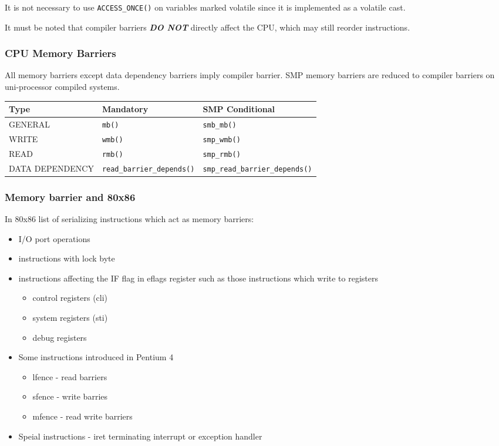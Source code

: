 \documentclass{article}
\begin{document}
It is not necessary to use \lstinline{ACCESS_ONCE()} on variables
marked volatile since it is implemented as a volatile cast.

It must be noted that compiler barriers \textbf{\emph{DO NOT}}
directly affect the CPU, which may still reorder instructions.


\subsubsection{CPU Memory Barriers}

All memory barriers except data dependency barriers imply compiler
barrier. SMP memory barriers are reduced to compiler barriers on
uni-processor compiled systems. 

\begin{center}
  \begin{tabular}{| l| l | l | }    
    \hline
    Type & Mandatory & SMP Conditional \\ \hline
    GENERAL & \lstinline{mb()} & \lstinline{smb_mb()} \\ 
    WRITE & \lstinline{wmb()} & \lstinline{smp_wmb()}  \\ 
    READ &  \lstinline{rmb()} & \lstinline{smp_rmb()}  \\
    DATA DEPENDENCY &  \lstinline{read_barrier_depends()} & \lstinline{smp_read_barrier_depends()} \\
    \hline
  \end{tabular}
\end{center}


\subsubsection{Memory barrier and 80x86}

  In 80x86 list of serializing instructions which act as memory
  barriers:


  \begin{itemize}
    \item I/O port operations
    \item instructions with lock byte
    \item instructions affecting the IF flag in eflags register such as those instructions which write to registers
      \begin{itemize}
        \item control registers (cli)
        \item system  registers (sti)
        \item debug   registers          
      \end {itemize}
    \item Some instructions introduced in Pentium 4
      \begin{itemize}
        \item lfence - read barriers
        \item sfence - write barries
        \item mfence - read write barriers
      \end{itemize}
    \item Speial instructions - iret terminating interrupt or exception handler                  
  \end{itemize}
  
\end{document}
